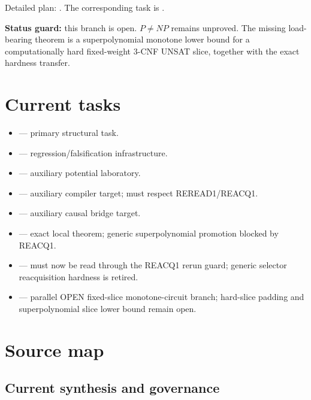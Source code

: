 \documentclass[11pt]{article}
\begin{document}
Detailed plan:
.
The corresponding task is .

\textbf{Status guard:} this branch is open. \(P\neq NP\) remains unproved. The missing
load-bearing theorem is a superpolynomial monotone lower bound for a computationally hard
fixed-weight \(3\)-CNF UNSAT slice, together with the exact hardness transfer.

\section{Current tasks}

\begin{itemize}
\item {} --- primary structural task.
\item {} --- regression/falsification infrastructure.
\item {} --- auxiliary potential laboratory.
\item {} --- auxiliary compiler target; must
respect REREAD1/REACQ1.
\item {} --- auxiliary causal bridge target.
\item {} --- exact local theorem; generic
superpolynomial promotion blocked by REACQ1.
\item {} --- must now be read through the
REACQ1 rerun guard; generic selector reacquisition hardness is retired.
\item {} --- parallel OPEN fixed-slice monotone-circuit branch; hard-slice padding and superpolynomial slice lower bound remain open.
\end{itemize}

\section{Source map}

\subsection{Current synthesis and governance}
\end{document}
